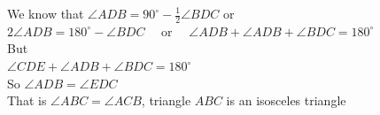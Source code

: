 \documentclass{article}
\begin{document}
We know that \(\angle A D B=90^{\circ}-\frac{1}{2} \angle B D C\) or\\
\(2 \angle A D B=180^{\circ}-\angle B D C \quad\) or \(\quad \angle A D B+\angle A D B+\angle B D C=180^{\circ}\)\\
But\\
\(\angle C D E+\angle A D B+\angle B D C=180^{\circ}\)\\
So \(\angle A D B=\angle E D C\)\\
That is \(\angle A B C=\angle A C B\), triangle \(A B C\) is an isosceles triangle\\
\end{document}
